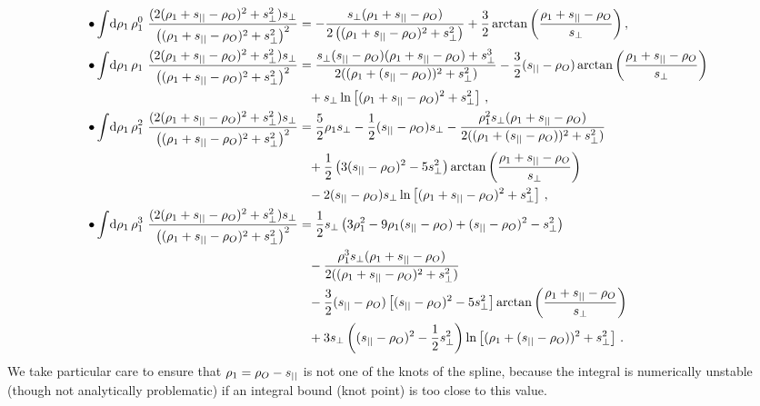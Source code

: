 \documentclass[fleqn,usenatbib]{mnras}
\begin{document}
    \begin{align}
       \bullet \int\!\dif{\rho_1}\, \rho_1^0~ \frac{(2(\rho_1+\spll-\rho_O)^2 + \sprp^2)\sprp}{\left(( \rho_1+\spll-\rho_O)^2+\sprp^2\right)^2}
            &= - \frac{\sprp(\rho_1+\spll-\rho_O)}
                      {2 \left((\rho_1+\spll-\rho_O)^2+\sprp^2\right)}
               + \frac{3}{2} \arctan{\left(\frac{\rho_1+\spll-\rho_O}{\sprp}\right)} \,,
        \\
        \bullet \int\!\dif{\rho_1}\,  \rho_1~ \frac{(2(\rho_1+\spll-\rho_O)^2 + \sprp^2)\sprp}{\left(( \rho_1+\spll-\rho_O)^2+\sprp^2\right)^2}
            &= \frac{\sprp(\spll-\rho_O) (\rho_1 +\spll-\rho_O ) + \sprp^3}
                    {2 ((\rho_1 + (\spll-\rho_O))^2 + \sprp^2)  } 
               - \frac{3}{2} (\spll-\rho_O) \arctan\left(\frac{\rho_1 + \spll-\rho_O}{\sprp}\right)
            \\
            &\phantom{=} + \sprp \ln\left[(\rho_1 + \spll-\rho_O)^2 + \sprp^2\right]   \,, \nonumber
        \\
        \bullet \int\!\dif{\rho_1}\, \rho_1^2~ \frac{(2(\rho_1+\spll-\rho_O)^2 + \sprp^2)\sprp}{\left(( \rho_1+\spll-\rho_O)^2+\sprp^2\right)^2}
            &=   \frac{5}{2} \rho_1 \sprp
               - \frac{1}{2} (\spll-\rho_O) \sprp
               - \frac{\rho_1^2 \sprp(\rho_1+\spll - \rho_O)}
                      {2 ((\rho_1 + (\spll-\rho_O))^2 + \sprp^2)}
            \\ \nonumber
            &\phantom{=} + \frac{1}{2} \left(3(\spll-\rho_O)^2 - 5\sprp^2 \right) \arctan\left( \frac{\rho_1 + \spll - \rho_O} {\sprp} \right)
            \\ \nonumber
            &\phantom{=} - 2 (\spll-\rho_O) \sprp \ln\left[(\rho_1 + \spll-\rho_O)^2 + \sprp^2\right] \,,
        \\
        \bullet \int\!\dif{\rho_1}\, \rho_1^3~ \frac{(2(\rho_1+\spll-\rho_O)^2 + \sprp^2)\sprp}{\left(( \rho_1+\spll-\rho_O)^2+\sprp^2\right)^2} 
            &=  \frac{1}{2}\sprp \left( 3\rho_1^2  - 9 \rho_1 (\spll-\rho_O)  + (\spll-\rho_O)^2  - \sprp^2 \right)
            \\ \nonumber
            &\phantom{=} - \frac{\rho_1^3 \sprp (\rho_1+\spll - \rho_O)} {2 ((\rho_1 + \spll - \rho_O)^2 + \sprp^2)}
            \\ \nonumber
            &\phantom{=} - \frac{3}{2} (\spll-\rho_O) \left[(\spll-\rho_O)^2 - 5 \sprp^2\right] \arctan\left( \frac{\rho_1 + \spll - \rho_O}{\sprp} \right)
            \\ \nonumber
            &\phantom{=} + 3 \sprp  \left((\spll-\rho_O)^2 - \frac{1}{2} \sprp^2\right) \ln\left[(\rho_1 + (\spll-\rho_O))^2 + \sprp^2\right]\,.
    \end{align}
    We take particular care to ensure that $\rho_1=\rho_O-s_{||}$ is not one of
    the knots of the spline, because the integral is numerically unstable
    (though not analytically problematic) if an integral bound (knot point) is
    too close to this value.
\end{document}
